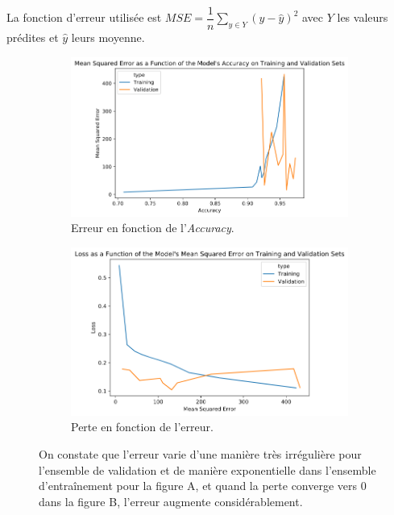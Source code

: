 \documentclass[french]{article}
\theoremstyle{mytheoremstyle}
\theoremstyle{mytheoremstyle}
\theoremstyle{myproblemstyle}
\begin{document}
   	La fonction d'erreur utilisée est $MSE = \dfrac{1}{n}\sum\limits_{y \in Y} (y - \hat{y})^2$ avec $Y$ les valeurs prédites et $\hat{y}$ leurs moyenne.
    
    \begin{figure}[H]
    \centering
    \begin{subfigure}[t]{0.5\textwidth}
            \centering
            \includegraphics[width=1\linewidth]{images/cnn_mse_acc.png}
            \caption{Erreur en fonction de l'\emph{Accuracy}.}
    \end{subfigure}%
    \begin{subfigure}[t]{0.5\textwidth}
            \centering
            \includegraphics[width=0.95\linewidth]{images/cnn_loss_mse.png}
            \caption{Perte en fonction de l'erreur.}
    \end{subfigure}
    \caption{On constate que l'erreur varie d'une manière très irrégulière pour l'ensemble de validation et de manière exponentielle dans l'ensemble d'entraînement pour la figure A, et quand la perte converge vers 0 dans la figure B, l'erreur augmente considérablement.}
    \end{figure}
    
\end{document}
